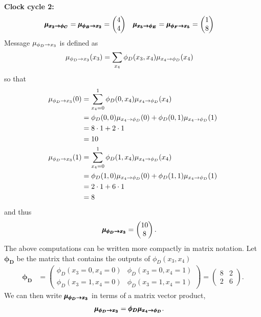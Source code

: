 \begin{exenumerate}
\begin{solution}
    { \bf Clock cycle 2:}\\
    \begin{align}
      \pmb{\mu_{{x_2\rightarrow \phi_C}}} = \pmb{\mu_{{\phi_B\rightarrow x_2}}}  & = \begin{pmatrix}
        4 \\
        4 \\
      \end{pmatrix}
      &
      \pmb{\mu_{{x_5\rightarrow \phi_E}}} =  \pmb{\mu_{{\phi_F\rightarrow x_5}}} & = \begin{pmatrix}
        1 \\
        8 \\
      \end{pmatrix}
    \end{align}
    Message $\fxmess{\phi_D}{x_3}{1}$ is defined as
    \begin{align}
      \fxmess{\phi_D}{x_3}{1}(x_3) & = \sum_{x_4} \phi_D(x_3,x_4) \xfmess{x_4}{\phi_D}{1}(x_4)\end{align}
    so that
    \begin{align}
      \fxmess{\phi_D}{x_3}{1}(0) & = \sum_{x_4=0}^1 \phi_D(0,x_4) \xfmess{x_4}{\phi_D}{1}(x_4) \\
      & = \phi_D(0,0) \xfmess{x_4}{\phi_D}{1}(0) + \phi_D(0,1) \xfmess{x_4}{\phi_D}{1}(1) \\
      & = 8 \cdot 1  + 2 \cdot 1\\
      & = 10\\
      \fxmess{\phi_D}{x_3}{1}(1) & = \sum_{x_4=0}^1 \phi_D(1,x_4) \xfmess{x_4}{\phi_D}{1}(x_4) \\
      & = \phi_D(1,0) \xfmess{x_4}{\phi_D}{1}(0) + \phi_D(1,1) \xfmess{x_4}{\phi_D}{1}(1) \\
      & = 2 \cdot 1 + 6 \cdot 1\\
      & = 8
    \end{align}
    and thus
    \begin{align}
      \pmb{\mu_{{\phi_D\rightarrow x_3}}} &=  \begin{pmatrix}
        10 \\
        8
      \end{pmatrix}.
    \end{align}
    The above computations can be written more compactly in matrix notation. Let $\pmb{\phi_D}$ be the matrix that contains the outputs of $\phi_D(x_3, x_4)$ 
    \begin{align}
      \pmb{\phi_D} & = \begin{pmatrix}
        \phi_D(x_3=0,x_4=0) &  \phi_D(x_3=0,x_4=1) \\
        \phi_D(x_3=1,x_4=0) & \phi_D(x_3=1,x_4=1)  
      \end{pmatrix}
       = \begin{pmatrix}
        8 & 2 \\
        2 & 6
      \end{pmatrix}.
    \end{align}
    We can then write $\pmb{\mu_{{\phi_D\rightarrow x_3}}}$ in terms of a matrix vector product,
    \begin{align}
      \pmb{\mu_{{\phi_D\rightarrow x_3}}} & = \pmb{\phi_D} \pmb{\mu_{{x_4\rightarrow \phi_D}}}.
    \end{align}
    

\end{solution}
\end{exenumerate}
